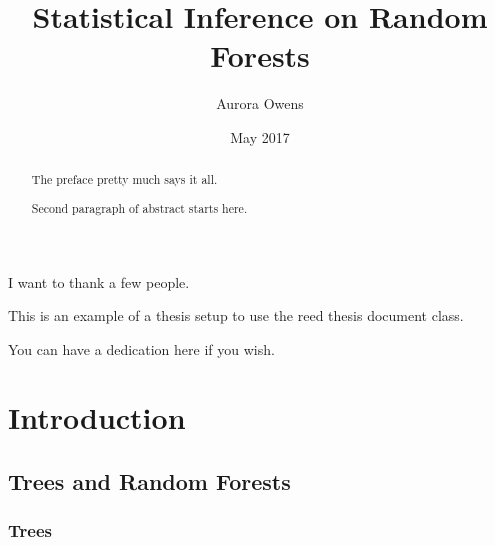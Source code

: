 \documentclass[12pt,twoside]{reedthesis}
\title{Statistical Inference on Random Forests}
\author{Aurora Owens}
\date{May 2017}
\begin{document}
      \maketitle
  
  \frontmatter %
  \pagestyle{empty} %

      \begin{acknowledgements}
      I want to thank a few people.
    \end{acknowledgements}
  
      \begin{preface}
      This is an example of a thesis setup to use the reed thesis document
      class.
    \end{preface}
  
      \hypersetup{linkcolor=black}
    \setcounter{tocdepth}{2}
    \tableofcontents
  
      \listoftables
  
      \listoffigures
  
      \begin{abstract}
      The preface pretty much says it all. \par  Second paragraph of abstract
      starts here.
    \end{abstract}
  
      \begin{dedication}
      You can have a dedication here if you wish.
    \end{dedication}
  
  \mainmatter %
  \pagestyle{fancyplain} %

  \chapter{Introduction}\label{introduction}
  
  \section{Trees and Random Forests}\label{trees-and-random-forests}
  
  \subsection{Trees}\label{trees}
  
\end{document}
